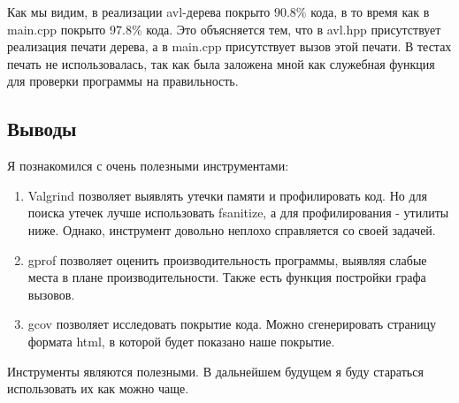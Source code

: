 \documentclass[12pt]{article}
\begin{document}
	Как мы видим, в реализации avl-дерева покрыто $90.8\%$ кода, в то время как в main.cpp покрыто $97.8\%$ кода. Это объясняется тем, что в avl.hpp присутствует реализация печати дерева, а в main.cpp присутствует вызов этой печати. В тестах печать не использовалась, так как была заложена мной как служебная функция для проверки программы на правильность.
	
	 
	
	\subsection*{Выводы}
	
	Я познакомился с очень полезными инструментами:
	\begin{enumerate}
		\item Valgrind позволяет выявлять утечки памяти и профилировать код. Но для поиска утечек лучше использовать fsanitize, а для профилирования - утилиты ниже. Однако, инструмент довольно неплохо справляется со своей задачей.
		\item gprof позволяет оценить производительность программы, выявляя слабые места в плане производительности. Также есть функция постройки графа вызовов.
		\item gcov позволяет исследовать покрытие кода. Можно сгенерировать страницу формата html, в которой будет показано наше покрытие.
	\end{enumerate}
	Инструменты являются полезными. В дальнейшем будущем я буду стараться использовать их как можно чаще.
\end{document}
